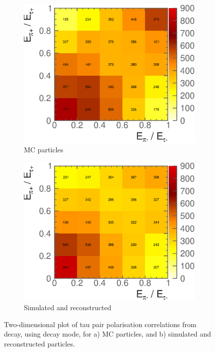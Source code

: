 \begin{figure}[htbp]
\centering %
\begin{subfigure}[b]{0.45\textwidth}
  \includegraphics[width=\textwidth]{tau/NoTimeAnalysis/2DMC}
  \caption{MC particles}
  \label{fig:TauSpin2DMC}
\end{subfigure}
\begin{subfigure}[b]{0.45\textwidth}
  \includegraphics[width=\textwidth]{tau/NoTimeAnalysis/2Dreco}
  \caption{Simulated and reconstructed}
  \label{fig:TauSpin2Dreco}
\end{subfigure}
\caption
{Two-dimensional plot of tau pair polarisation correlations from \PZ decay, using \tauToPion decay mode, for a) MC particles, and b) simulated and reconstructed particles.}
\label{fig:TauSpin2D}
\end{figure}

